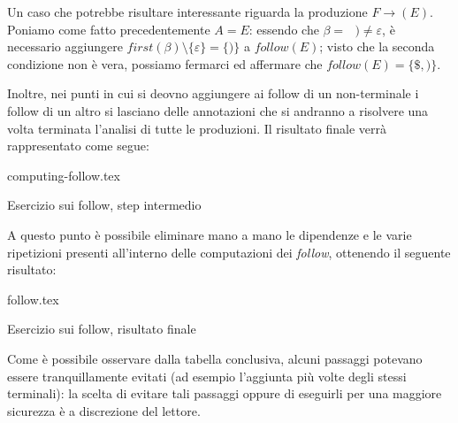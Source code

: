 \documentclass[class=book, crop=false, oneside, 12pt]{standalone}
\begin{document}
Un caso che potrebbe risultare interessante riguarda la produzione \(F \rightarrow (E)\). Poniamo come fatto precedentemente \(A = E\): essendo che \(\beta = \textrm{ } ) \neq \varepsilon\), è necessario aggiungere \(first(\beta) \setminus \{\varepsilon\} = \{)\}\) a \(follow(E)\); visto che la seconda condizione non è vera, possiamo fermarci ed affermare che \(follow(E) = \{\$, )\}\).

Inoltre, nei punti in cui si deovno aggiungere ai follow di un non-terminale i follow di un altro si lasciano delle annotazioni che si andranno a risolvere una volta terminata l'analisi di tutte le produzioni. Il risultato finale verrà rappresentato come segue:
\begin{table}[H]
	\centering
	{computing-follow.tex}
    \caption{Esercizio sui follow, step intermedio}
    \label{computing-follow}
\end{table}
A questo punto è possibile eliminare mano a mano le dipendenze e le varie ripetizioni presenti all'interno delle computazioni dei \emph{follow}, ottenendo il seguente risultato: 
\begin{table}[H]
	\centering
	{follow.tex}
    \caption{Esercizio sui follow, risultato finale}
    \label{follow}
\end{table}
Come è possibile osservare dalla tabella conclusiva, alcuni passaggi potevano essere tranquillamente evitati (ad esempio l'aggiunta più volte degli stessi terminali): la scelta di evitare tali passaggi oppure di eseguirli per una maggiore sicurezza è a discrezione del lettore.
\end{document}
